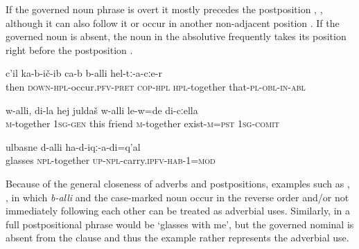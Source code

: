 If the governed noun phrase is overt it mostly precedes the postposition , , although it can also follow it  or occur in another non-adjacent position . If the governed noun is absent, the noun in the absolutive frequently takes its position right before the postposition .
%
\begin{exe}
	\ex
	\begin{xlist}
		\ex	\label{Then the ran together with them}
		\gll	c'il	ka-b-ič-ib	ca-b	b-alli	hel-tː-a-cːe-r   \\
			then	\textsc{down-hpl}-occur.\textsc{pfv}-\textsc{pret}	\textsc{cop-hpl}	\textsc{hpl}-together	that-\textsc{pl}-\textsc{obl}-\textsc{in}-\textsc{abl}\\
		\glt	{}

		\ex	\label{Myfriend was together with me}
		\gll	w-alli,	di-la	hej	juldaš	w-alli	le-w=de	di-cːella\\
			\textsc{m}-together	1\textsc{sg}-\textsc{gen}	this	friend	\textsc{m}-together	exist-\textsc{m}=\textsc{pst}	1\textsc{sg}-\textsc{comit}\\
		\glt	{}

		\ex	\label{If I had known that I will look at picture}
		\gll	ulbasne	d-alli	ha-d-iqː-a-di=q'al\\
			glasses	\textsc{npl}-together	\textsc{up}-\textsc{npl}-carry.\textsc{ipfv}-\textsc{hab}-1=\textsc{mod}\\
		\glt	{}
	\end{xlist}
\end{exe}

Because of the general closeness of adverbs and postpositions, examples such as , , in which \textit{b-alli} and the case-marked noun occur in the reverse order and/or not immediately following each other can be treated as adverbial uses. Similarly, in  a full postpositional phrase would be `glasses with me', but the governed nominal is absent from the clause and thus the example rather represents the adverbial use.

